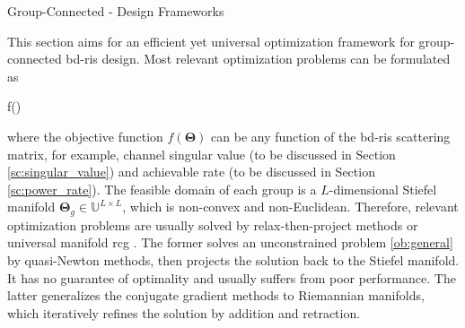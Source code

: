 \documentclass[journal]{IEEEtran}
\begin{document}
\begin{section}{Group-Connected - Design Frameworks}

	This section aims for an efficient yet universal optimization framework for group-connected \gls{bd}-\gls{ris} design.
	Most relevant optimization problems can be formulated as
	\begin{maxi!}
		{\scriptstyle{\mathbf{\Theta}}}{f(\mathbf{\Theta})}{\label{op:general}}{\label{ob:general}}
	\end{maxi!}
	where the objective function $f(\mathbf{\Theta})$ can be any function of the \gls{bd}-\gls{ris} scattering matrix, for example, channel singular value (to be discussed in Section \ref{sc:singular_value}) and achievable rate (to be discussed in Section \ref{sc:power_rate}).
	The feasible domain of each group is a $L$-dimensional Stiefel manifold $\mathbf{\Theta}_g \in \mathbb{U}^{L \times L}$, which is non-convex and non-Euclidean.
	Therefore, relevant optimization problems are usually solved by relax-then-project methods \cite{Fang2023} or universal manifold \gls{rcg} \cite{Li2023b,Li2023c,Zhou2023}.
	The former solves an unconstrained problem \eqref{ob:general} by quasi-Newton methods, then projects the solution back to the Stiefel manifold.
	It has no guarantee of optimality and usually suffers from poor performance.
	The latter generalizes the conjugate gradient methods to Riemannian manifolds, which iteratively refines the solution by addition and retraction.

\end{section}
\end{document}
